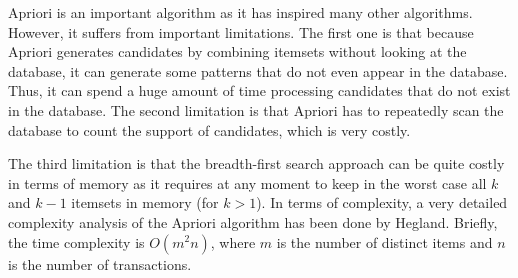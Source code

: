 Apriori is an important algorithm as it has inspired many other algorithms. However, it
suffers from important limitations. The first one is that because Apriori generates candidates
by combining itemsets without looking at the database, it can generate some patterns that
do not even appear in the database. Thus, it can spend a huge amount of time processing
candidates that do not exist in the database. The second limitation is that Apriori has to
repeatedly scan the database to count the support of candidates, which is very costly.

The third limitation is that the breadth-first search approach can be quite costly in terms of
memory as it requires at any moment to keep in the worst case all $k$ and $k - 1$ itemsets
in memory (for $k > 1$). In terms of complexity, a very detailed complexity analysis of the
Apriori algorithm has been done by Hegland\cite{hegland}. Briefly, the time complexity is $O(m^2n)$,
where $m$ is the number of distinct items and $n$ is the number of transactions.